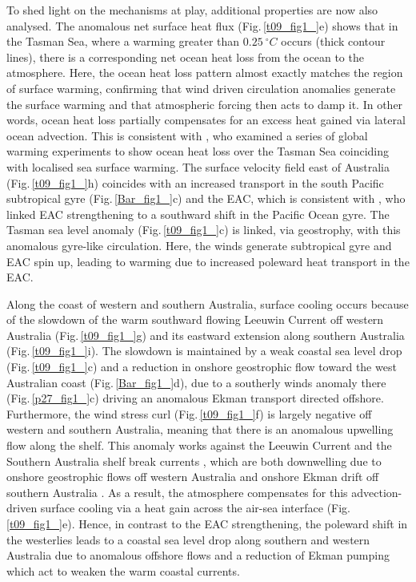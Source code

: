 \documentclass[draft,linenumbers]{agujournal2018}
\begin{document}
To shed light on the mechanisms at play, additional properties are now also analysed. The anomalous net surface heat flux (Fig.\,\ref{t09_fig1_}e) shows that in the Tasman Sea, where a warming greater than $0.25\ ^{\circ}C$ occurs (thick contour lines), there is a corresponding net ocean heat loss from the ocean to the atmosphere. Here, the ocean heat loss pattern almost exactly matches the region of surface warming, confirming that wind driven circulation anomalies generate the surface warming and that atmospheric forcing then acts to damp it. In other words, ocean heat loss partially compensates for an excess heat gained via lateral ocean advection. This is consistent with \citet{Cai2005}, who examined a series of global warming experiments to show ocean heat loss over the Tasman Sea coinciding with localised sea surface warming. The surface velocity field east of Australia (Fig.\,\ref{t09_fig1_}h) coincides with an increased transport in the south Pacific subtropical gyre (Fig.\,\ref{Bar_fig1_}c) and the EAC, which is consistent with \citet{Hill2011}, who linked EAC strengthening to a southward shift in the Pacific Ocean gyre. The Tasman sea level anomaly (Fig.\,\ref{t09_fig1_}c) is linked, via geostrophy, with this anomalous gyre-like circulation. Here, the winds generate subtropical gyre and EAC spin up, leading to warming due to increased poleward heat transport in the EAC.

Along the coast of western and southern Australia, surface cooling occurs because of the slowdown of the warm southward flowing Leeuwin Current off western Australia (Fig.\,\ref{t09_fig1_}g) and its eastward extension along southern Australia (Fig.\,\ref{t09_fig1_}i). The slowdown is maintained by a weak coastal sea level drop (Fig.\,\ref{t09_fig1_}c) and a reduction in onshore geostrophic flow toward the west Australian coast (Fig.\,\ref{Bar_fig1_}d), due to a southerly winds anomaly there (Fig.\,\ref{p27_fig1_}c) driving an anomalous Ekman transport directed offshore. Furthermore, the wind stress curl (Fig.\,\ref{t09_fig1_}f) is largely negative off western and southern Australia, meaning that there is an anomalous upwelling flow along the shelf. This anomaly works against the Leeuwin Current and the Southern Australia shelf break currents \citep{Furue2017,Middleton2007}, which are both downwelling due to onshore geostrophic flows off western Australia \citep{Godfrey1985} and onshore Ekman drift off southern Australia \citep{Middleton2007}. As a result, the atmosphere compensates for this advection-driven surface cooling via a heat gain across the air-sea interface (Fig.\,\ref{t09_fig1_}e). Hence, in contrast to the EAC strengthening, the poleward shift in the westerlies leads to a coastal sea level drop along southern and western Australia due to anomalous offshore flows and a reduction of Ekman pumping which act to weaken the warm coastal currents.
\end{document}
